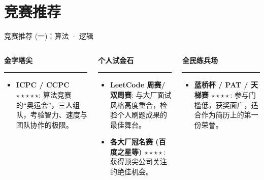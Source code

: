 \documentclass{beamer}
\begin{document}
\section{竞赛推荐}
\begin{frame}{竞赛推荐 (一)：算法 · 逻辑}
    \begin{columns}[T]
        \begin{column}{0.33\textwidth}
            \begin{center}
                \Large\textbf{金字塔尖} \\
                \rule{\linewidth}{0.4pt}
            \end{center}
            \begin{itemize}
                \item \textbf{ICPC / CCPC $\star \star \star \star \star$}: \small 算法竞赛的“奥运会”，三人组队，考验智力、速度与团队协作的极限。
            \end{itemize}
        \end{column}
        
        \begin{column}{0.33\textwidth}
            \begin{center}
                \Large\textbf{个人试金石} \\
                \rule{\linewidth}{0.4pt}
            \end{center}
            \begin{itemize}
                \item \textbf{LeetCode 周赛/双周赛}: \small 与大厂面试风格高度重合，检验个人刷题成果的最佳舞台。
                \item \textbf{各大厂冠名赛 (百度之星等) $\star \star \star \star$}: \small 获得顶尖公司关注的绝佳机会。
            \end{itemize}
        \end{column}
        
        \begin{column}{0.33\textwidth}
            \begin{center}
                \Large\textbf{全民练兵场} \\
                \rule{\linewidth}{0.4pt}
            \end{center}
            \begin{itemize}
                \item \textbf{蓝桥杯 / PAT / 天梯赛 $\star \star \star \star$}: \small \alert{参与门槛低，获奖面广}，适合作为简历上的第一份荣誉。
            \end{itemize}
        \end{column}
    \end{columns}
\end{frame}
\end{document}

